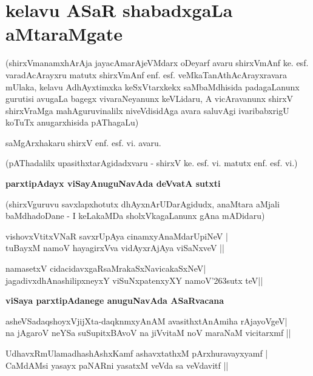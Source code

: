 {\chapter{kelavu ASaR shabadxgaLa aMtaraMgate}}

\noindent
(shirxVmanamxhArAja jayacAmarAjeVMdarx oDeyarf avaru shirxVmAnf ke. esf. varadAcArayxru matutx shirxVmAnf enf. esf. veMkaTanAthAcArayxravara mUlaka, kelavu AdhAyxtimxka keSxVtarxkekx saMbaMdhisida padagaLanunx gurutisi avugaLa bagegx vivaraNeyanunx keVLidaru, A vicAravanunx shirxV shirxVraMga mahAguruvinalilx niveVdisidAga avara saluvAgi ivaribabxrigU koTuTx anugarxhisida pAThagaLu)

\medskip

\hfill{saMgArxhakaru shirxV enf. esf. vi. avaru.}

\medskip
\noindent
\centerline{(pAThadalilx upasithxtarAgidadxvaru - shirxV ke. esf. vi. matutx enf. esf. vi.)}

\bigskip
\noindent
{\large\bf parxtipAdayx viSayAnuguNavAda deVvatA sutxti}\label{page128}
\medskip

\noindent
(shirxVguruvu savxlapxhotutx dhAyxnArUDarAgidudx, anaMtara aMjali baMdhadoDane - I keLakaMDa sholxVkagaLanunx gAna mADidaru)


\begin{shloka}
vishovxVtitxVNaR savxrUpAya cinamxyAnaMdarUpiNeV |\\\label{128}
tuBayxM namoV hayagirxVva vidAyxrAjAya viSaNxveV ||
\end{shloka}
\begin{shloka}
namasetxV cidacidavxgaRsaMrakaSxNavicakaSxNeV|\\\label{128a}
jagadivxdhAnashilipxneyxY viSuNxpatenxyXY namoV\char'263sutx teV||
\end{shloka}


\newpage

\bigskip
\noindent
{\large\bf viSaya parxtipAdanege anuguNavAda ASaRvacana}

\begin{shloka}
asheVSadaqshoyxVjijXta-daqknmxyAnAM avasithxtAnAmiha rAjayoVgeV|\\\label{128b}
na jAgaroV neYSa suSupitxBAvoV na jiVvitaM noV maraNaM vicitarxmf ||
\end{shloka}
\begin{shloka}
UdhavxRmUlamadhashAshxKamf ashavxtathxM pArxhuravayxyamf |\\\label{128c}
CaMdAMsi yasayx paNARni yasatxM veVda sa veVdavitf ||
\end{shloka}

